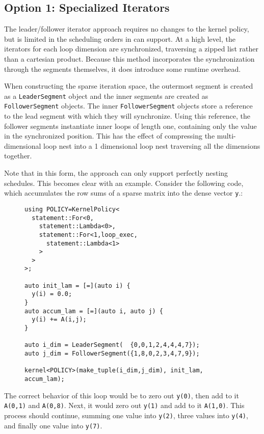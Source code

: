 \subsection{Option 1: Specialized Iterators}
The leader/follower iterator approach requires no changes to the kernel policy, but is limited in the scheduling orders in can support. 
At a high level, the iterators for each loop dimension are synchronized, traversing a zipped list rather than a cartesian product. 
Because this method incorporates the synchronization through the segments themselves, it does introduce some runtime overhead.

When constructing the sparse iteration space, the outermost segment is created as a \verb.LeaderSegment. object and the inner segments are created as \verb.FollowerSegment. objects.
The inner \verb.FollowerSegment. objects store a reference to the lead segment with which they will synchronize.
Using this reference, the follower segments instantiate inner loops of length one, containing only the value in the synchronized position. 
This has the effect of compressing the multi-dimensional loop nest into a 1 dimensional loop nest traversing all the dimensions together.

Note that in this form, the approach can only support perfectly nesting schedules.
This becomes clear with an example.
Consider the following code, which accumulates the row sums of a sparse matrix into the dense vector \verb.y..:
\begin{figure}
\begin{lstlisting}
using POLICY=KernelPolicy<
  statement::For<0,
    statement::Lambda<0>,
    statement::For<1,loop_exec,
      statement::Lambda<1>
    >
  >
>;

auto init_lam = [=](auto i) {
  y(i) = 0.0;
}
auto accum_lam = [=](auto i, auto j) {
  y(i) += A(i,j);
}

auto i_dim = LeaderSegment(  {0,0,1,2,4,4,4,7});
auto j_dim = FollowerSegment({1,8,0,2,3,4,7,9});

kernel<POLICY>(make_tuple(i_dim,j_dim), init_lam, accum_lam);
\end{lstlisting}
\end{figure}
The correct behavior of this loop would be to zero out \verb.y(0)., then add to it \verb.A(0,1). and \verb.A(0,8)..
Next, it would zero out \verb.y(1). and add to it \verb.A(1,0)..
This process should continue, summing one value into \verb.y(2)., three values into \verb.y(4)., and finally one value into \verb.y(7)..

